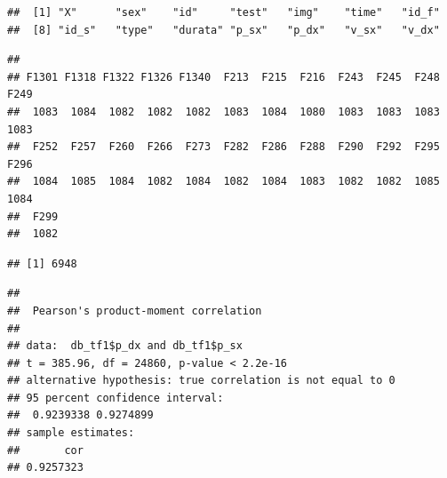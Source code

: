 \documentclass[]{article}
\newenvironment{Shaded}{\begin{snugshade}}{\end{snugshade}}
\newcommand{\CommentTok}[1]{\textcolor[rgb]{0.56,0.35,0.01}{\textit{#1}}}
\newcommand{\KeywordTok}[1]{\textcolor[rgb]{0.13,0.29,0.53}{\textbf{#1}}}
\newcommand{\NormalTok}[1]{#1}
\newcommand{\OperatorTok}[1]{\textcolor[rgb]{0.81,0.36,0.00}{\textbf{#1}}}
\begin{document}
\begin{verbatim}
##  [1] "X"      "sex"    "id"     "test"   "img"    "time"   "id_f"  
##  [8] "id_s"   "type"   "durata" "p_sx"   "p_dx"   "v_sx"   "v_dx"
\end{verbatim}

\begin{Shaded}
\end{Shaded}

\begin{verbatim}
## 
## F1301 F1318 F1322 F1326 F1340  F213  F215  F216  F243  F245  F248  F249 
##  1083  1084  1082  1082  1082  1083  1084  1080  1083  1083  1083  1083 
##  F252  F257  F260  F266  F273  F282  F286  F288  F290  F292  F295  F296 
##  1084  1085  1084  1082  1084  1082  1084  1083  1082  1082  1085  1084 
##  F299 
##  1082
\end{verbatim}

\begin{Shaded}
\end{Shaded}

\begin{verbatim}
## [1] 6948
\end{verbatim}

\begin{Shaded}
\end{Shaded}

\begin{verbatim}
## 
##  Pearson's product-moment correlation
## 
## data:  db_tf1$p_dx and db_tf1$p_sx
## t = 385.96, df = 24860, p-value < 2.2e-16
## alternative hypothesis: true correlation is not equal to 0
## 95 percent confidence interval:
##  0.9239338 0.9274899
## sample estimates:
##       cor 
## 0.9257323
\end{verbatim}
\end{document}
